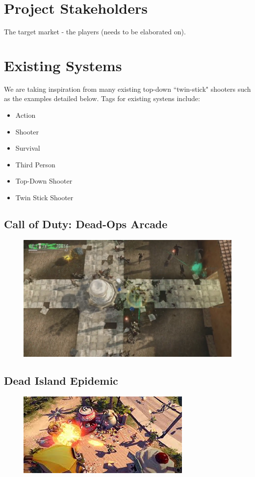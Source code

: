 \documentclass[11pt]{article}
\begin{document}
\section*{Project Stakeholders}
The target market - the players (needs to be elaborated on).

\section*{Existing Systems}
We are taking inspiration from many existing top-down ``twin-stick" shooters such as the examples detailed below. Tags for existing systens include:
\begin{itemize}
	\item Action
	\item Shooter
	\item Survival 
	\item Third Person
	\item Top-Down Shooter
	\item Twin Stick Shooter
\end{itemize}
\subsection*{Call of Duty: Dead-Ops Arcade}
\begin{figure}[H]
	\includegraphics[scale=0.25]{call_of_duty_dead_ops_arcade.jpg}
	\centering
\end{figure}
\subsection*{Dead Island Epidemic}
\begin{figure}[H]
	\includegraphics[scale=1]{dead_island.jpg}
	\centering
\end{figure}
\end{document}
